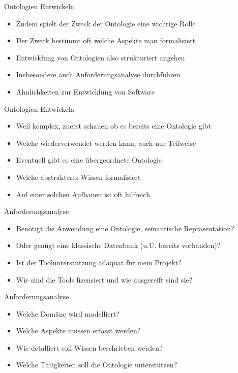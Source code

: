 \documentclass{beamer}
\begin{document}
\begin{frame}{Ontologien Entwickeln}
	
	\begin{itemize}
		\item Zudem spielt der Zweck der Ontologie eine wichtige Rolle
		\item Der Zweck bestimmt oft welche Aspekte man formalisiert
		\item Entwicklung von Ontologien also strukturiert angehen
		\item Insbesondere auch Anforderungsanalyse durchführen
		\item Ähnlichkeiten zur Entwicklung von Software
	\end{itemize}
	
\end{frame}

\begin{frame}{Ontologien Entwickeln}
	
	\begin{itemize}
		\item Weil komplex, zuerst schauen ob es bereits eine Ontologie gibt
		\item Welche wiederverwendet werden kann, auch nur Teilweise
		\item Eventuell gibt es eine übergeordnete Ontologie
		\item Welche abstrakteres Wissen formalisiert
		\item Auf einer solchen Aufbauen ist oft hilfreich
	\end{itemize}
	
\end{frame}

\begin{frame}{Anforderungsanalyse}
	
	\begin{itemize}
		\item Benötigt die Anwendung eine Ontologie, semantische Repräsentation?
		\item Oder genügt eine klassische Datenbank (u.U. bereits vorhanden)?
		\item Ist der Toolunterstützung adäquat für mein Projekt?
		\item Wie sind die Tools lizensiert und wie ausgereift sind sie?
	\end{itemize}
	
\end{frame}

\begin{frame}{Anforderungsanalyse}
	
	\begin{itemize}
		\item Welche Domäne wird modelliert?
		\item Welche Aspekte müssen erfasst werden?
		\item Wie detalliert soll Wissen beschrieben werden?
		\item Welche Tätigkeiten soll die Ontologie unterstützen?
	\end{itemize}
	
\end{frame}
\end{document}
